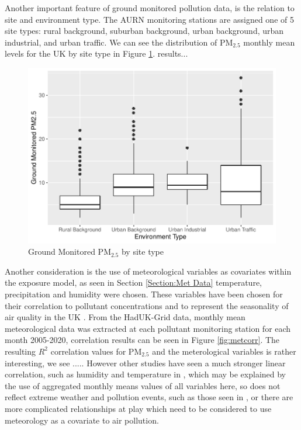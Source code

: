 Another important feature of ground monitored pollution data, is the relation to site and environment type. The AURN monitoring stations are assigned one of 5 site types: rural background, suburban background, urban background, urban industrial, and urban traffic. We can see the distribution of PM$_{2.5}$ monthly mean levels for the UK by site type in Figure \ref{fig:pm25sites}. results...

\begin{figure}[h]
    \centering
    \includegraphics[width=1\textwidth]{Images/PM2.5 Boxplot.pdf}
    \caption{Ground Monitored PM$_{2.5}$ by site type}
    \label{fig:pm25sites}
\end{figure}

Another consideration is the use of meteorological variables as covariates within the exposure model, as seen in Section \ref{Section:Met Data} temperature, precipitation and humidity were chosen. These variables have been chosen for their correlation to pollutant concentrations and to represent the seasonality of air quality in the UK \citep{Hodgson2021SeasonalUK}. From the HadUK-Grid data, monthly mean meteorological data was extracted at each pollutant monitoring station for each month 2005-2020, correlation results can be seen in Figure \ref{fig:metcorr}. The resulting $R^2$ correlation values for PM$_{2.5}$ and the meterological variables is rather interesting, we see ..... However other studies have seen a much stronger linear correlation, such as humidity and temperature in \cite{Berrocal2020AConcentration}, which may be explained by the use of aggregated monthly means values of all variables here, so does not reflect extreme weather and pollution events, such as those seen in \cite{Kalisa2018TemperatureUK}, or there are more complicated relationships at play which need to be considered to use meteorology as a covariate to air pollution.

